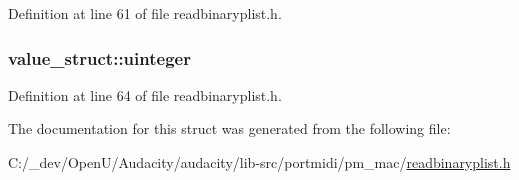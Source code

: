 Definition at line 61 of file readbinaryplist.\+h.

\subsubsection[{\texorpdfstring{uinteger}{uinteger}}]{ value\+\_\+struct\+::uinteger}\hypertarget{structvalue__struct_a6bbecf5accb53108caa85bef52ddecca}{}\label{structvalue__struct_a6bbecf5accb53108caa85bef52ddecca}


Definition at line 64 of file readbinaryplist.\+h.



The documentation for this struct was generated from the following file\+:\begin{DoxyCompactItemize}
\item 
C\+:/\+\_\+dev/\+Open\+U/\+Audacity/audacity/lib-\/src/portmidi/pm\+\_\+mac/\hyperlink{readbinaryplist_8h}{readbinaryplist.\+h}\end{DoxyCompactItemize}
